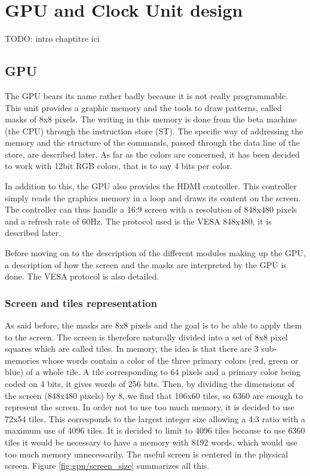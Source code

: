 \chapter{GPU and Clock Unit design}

TODO: intro chaptitre ici

\section{GPU}
The GPU bears its name rather badly because it is not really programmable. This unit provides a 
graphic memory and the tools to draw patterns, called masks of 8x8 pixels. The writing in this 
memory is done from the beta machine (the CPU) through the instruction store (ST). The specific way 
of addressing the memory and the structure of the commands, passed through the data line of the 
store, are described later. As far as the colors are concerned, it has been decided to work with 
12bit RGB colors, that is to say 4 bits per color.

In addition to this, the GPU also provides the HDMI controller. This controller simply reads the 
graphics memory in a loop and draws its content on the screen. The controller can thus handle a 
16:9 screen with a resolution of 848x480 pixels and a refresh rate of 60Hz. The protocol used is 
the VESA 848x480, it is described later. 

Before moving on to the description of the different modules making up the GPU, a description of 
how the screen and the masks are interpreted by the GPU is done. The VESA protocol is also detailed.

\subsection{Screen and tiles representation}

As said before, the masks are 8x8 pixels and the goal is to be able to apply them to the screen. 
The screen is therefore naturally divided into a set of 8x8 pixel squares which are called tiles. 
In memory, the idea is that there are 3 sub-memories whose words contain a color of the three 
primary colors (red, green or blue) of a whole tile. A tile corresponding to 64 pixels and a 
primary color being coded on 4 bits, it gives words of 256 bits. Then, by dividing the dimensions 
of the screen (848x480 pixels) by 8, we find that 106x60 tiles, so 6360 are enough to represent 
the screen. In order not to use too much memory, it is decided to use 72x54 tiles. This corresponds 
to the largest integer size allowing a 4:3 ratio with a maximum use of 4096 tiles.  It is decided 
to limit to 4096 tiles because to use 6360 tiles it would be necessary to have a memory with 8192 
words, which would use too much memory unnecessarily. The useful screen is centered in the physical 
screen. Figure \ref{fig:gpu/screen_size} summarizes all this.

